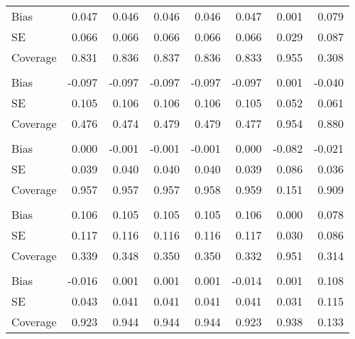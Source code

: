 \begin{table}
\begin{tabular}{lddddddd}
\hspace{1em}Bias & 0.047 & 0.046 & 0.046 & 0.046 & 0.047 & 0.001 & 0.079\\
\hspace{1em}SE & 0.066 & 0.066 & 0.066 & 0.066 & 0.066 & 0.029 & 0.087\\
\hspace{1em}Coverage & 0.831 & 0.836 & 0.837 & 0.836 & 0.833 & 0.955 & 0.308\\
\addlinespace[0.3em]
\\
\hspace{1em}Bias & -0.097 & -0.097 & -0.097 & -0.097 & -0.097 & 0.001 & -0.040\\
\hspace{1em}SE & 0.105 & 0.106 & 0.106 & 0.106 & 0.105 & 0.052 & 0.061\\
\hspace{1em}Coverage & 0.476 & 0.474 & 0.479 & 0.479 & 0.477 & 0.954 & 0.880\\
\addlinespace[0.3em]
\\
\hspace{1em}Bias & 0.000 & -0.001 & -0.001 & -0.001 & 0.000 & -0.082 & -0.021\\
\hspace{1em}SE & 0.039 & 0.040 & 0.040 & 0.040 & 0.039 & 0.086 & 0.036\\
\hspace{1em}Coverage & 0.957 & 0.957 & 0.957 & 0.958 & 0.959 & 0.151 & 0.909\\
\addlinespace[0.3em]
\\
\hspace{1em}Bias & 0.106 & 0.105 & 0.105 & 0.105 & 0.106 & 0.000 & 0.078\\
\hspace{1em}SE & 0.117 & 0.116 & 0.116 & 0.116 & 0.117 & 0.030 & 0.086\\
\hspace{1em}Coverage & 0.339 & 0.348 & 0.350 & 0.350 & 0.332 & 0.951 & 0.314\\
\addlinespace[0.3em]
\\
\hspace{1em}Bias & -0.016 & 0.001 & 0.001 & 0.001 & -0.014 & 0.001 & 0.108\\
\hspace{1em}SE & 0.043 & 0.041 & 0.041 & 0.041 & 0.041 & 0.031 & 0.115\\
\hspace{1em}Coverage & 0.923 & 0.944 & 0.944 & 0.944 & 0.923 & 0.938 & 0.133\\
\bottomrule
\end{tabular}
\end{table}

